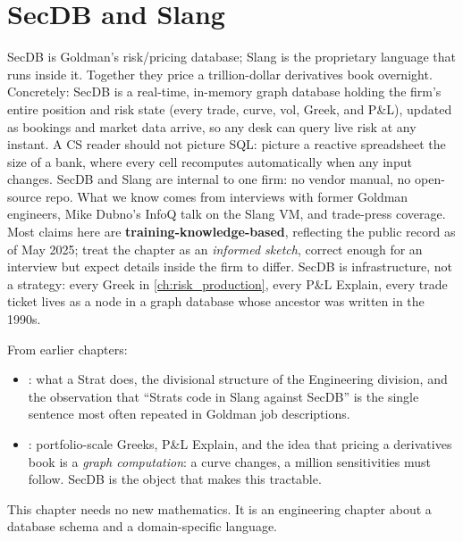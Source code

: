 \chapter{SecDB and Slang}
\label{ch:secdb_slang}

SecDB is Goldman's risk/pricing database; Slang is the proprietary
language that runs inside it.  Together they price a
trillion-dollar derivatives book overnight.  Concretely: SecDB is a
real-time, in-memory graph database holding the firm's entire
position and risk state (every trade, curve, vol, Greek, and
P\&L), updated as bookings and market data arrive, so any desk
can query live risk at any instant.  A CS reader should not picture
SQL: picture a reactive spreadsheet the size of a bank, where every
cell recomputes automatically when any input changes.  SecDB and Slang are
internal to one firm: no vendor manual, no open-source repo.
What we know comes from interviews with former Goldman engineers,
Mike Dubno's InfoQ talk on the Slang VM, and trade-press coverage.
Most claims here are \textbf{training-knowledge-based}, reflecting
the public record as of May 2025; treat the chapter as an
\emph{informed sketch}, correct enough for an interview but
expect details inside the firm to differ.  SecDB is infrastructure,
not a strategy: every Greek in \cref{ch:risk_production}, every
P\&L Explain, every trade ticket lives as a node in a graph
database whose ancestor was written in the 1990s.

\begin{backgroundbox}[Prerequisites]
From earlier chapters:
\begin{itemize}
  \item {}: what a Strat does, the divisional
    structure of the Engineering division, and the observation
    that ``Strats code in Slang against SecDB'' is the single
    sentence most often repeated in Goldman job descriptions.
  \item {}: portfolio-scale Greeks, P\&L
    Explain, and the idea that pricing a derivatives book is a
    \emph{graph computation}: a curve changes, a million
    sensitivities must follow.  SecDB is the object that makes
    this tractable.
\end{itemize}
This chapter needs no new mathematics.  It is an engineering
chapter about a database schema and a domain-specific language.
\end{backgroundbox}


